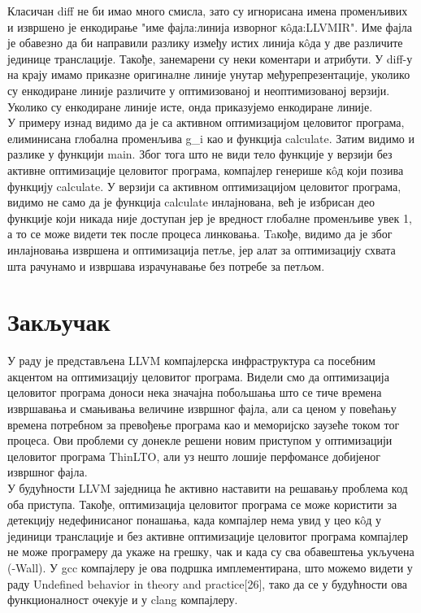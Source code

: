 \documentclass[12pt,oneside]{memoir}
\begin{document}
Класичан diff не би имао много смисла, зато су игнорисана имена променљивих
и извршено је енкодирање "име фајла:линија изворног  к\^{o}да:LLVMIR".
Име фајла је обавезно да би направили разлику између истих линија  к\^{o}да у две различите јединице транслације.
Такође, занемарени су неки коментари и атрибути.
У diff-у на крају имамо приказне оригиналне линије унутар међурепрезентације, 
уколико су енкодиране линије различите у оптимизованој и неоптимизованој верзији.
Уколико су енкодиране линије исте, онда приказујемо енкодиране линије.
\\
У примеру изнад видимо да је са активном оптимизацијом целовитог програма,
елиминисана глобална променљива g{\_}i  као и функција calculate.
Затим видимо и разлике у функцији main. 
Због тога што не види тело функције у верзији без активне оптимизације целовитог
програма, компајлер генерише к\^{o}д који позива функцију calculate.
У верзији са активном оптимизацијом целовитог програма, видимо не само да је функција
calculate инлајнована, већ је избрисан део функције који никада није доступан
јер је вредност глобалне променљиве увек 1, а то се може видети тек после процеса
линковања.
Taкође, видимо да је због инлајновања извршена и оптимизација петље, јер алат за
оптимизацију схвата шта рачунамо и извршава израчунавање без потребе за петљом.

\chapter{Закључак}
У раду је представљена LLVM компајлерска инфраструктура са посебним акцентом
на оптимизацију целовитог програма.
Видели смо да оптимизација целовитог програма доноси нека значајна побољшања
што се тиче времена извршавања и смањивања величине извршног фајла, али
са ценом у повећању времена потребном за превођење програма као и меморијско
заузеће током тог процеса.
Ови проблеми су донекле решени новим приступом у оптимизацији целовитог програма
ThinLTO, али уз нешто лошије перфомансе добијеног извршног фајла.
\\
У будућности LLVM заједница ће активно наставити на решавању проблема код 
оба приступа.
Такође, оптимизација целовитог програма се може користити за детекцију недефинисаног
понашања, када компајлер нема увид у цео к\^{o}д у јединици транслације и без
активне оптимизације целовитог програма компајлер не може програмеру да укаже
на грешку, чак и када су сва обавештења укључена (-Wall).
У gcc компајлеру је ова подршка имплементирана, што можемо видети у раду
Undefined behavior in theory and practice[26], тако да се у будућности ова
функционалност очекује и у clang компајлеру.
\end{document}
